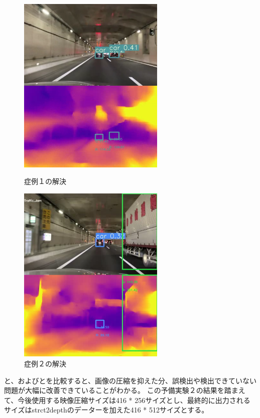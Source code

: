 \begin{figure}[htbp]
  \begin{minipage}{0.5\hsize}
   \begin{center}
    \includegraphics[width=7cm]{figs/pre1_after.png}
   \end{center}
   \caption{症例１の解決}
   \label{fig:pre2after1}
  \end{minipage}
  \begin{minipage}{0.5\hsize}
  \begin{center}
   \includegraphics[width=7cm]{figs/pre1_after2.png}
  \end{center}
   \caption{症例２の解決}
   \label{fig:pre2after2}
  \end{minipage}
 \end{figure}

と、およびとを比較すると、画像の圧縮を抑えた分、誤検出や検出できていない問題が大幅に改善できていることがわかる。
この予備実験２の結果を踏まえて、今後使用する映像圧縮サイズは416 * 256サイズとし、最終的に出力されるサイズはstrct2depthのデーターを加えた416 * 512サイズとする。

